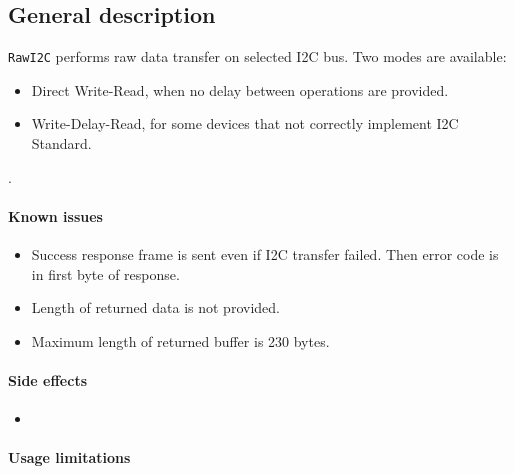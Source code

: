 

\subsection{General description}



\texttt{RawI2C} performs raw data transfer on selected I2C bus.
Two modes are available:
\begin{itemize}
	\item Direct Write-Read, when no delay between operations are provided.
	\item Write-Delay-Read, for some devices that not correctly implement I2C Standard. 
\end{itemize}
.

\paragraph{Known issues}
\begin{itemize}
	\item Success response frame is sent even if I2C transfer failed. Then error code is in first byte of response.
	\item Length of returned data is not provided. 
	\item Maximum length of returned buffer is 230 bytes. 
\end{itemize}

\paragraph{Side effects}
\begin{itemize}
	\item {}
\end{itemize}

\paragraph{Usage limitations}\mbox{}\\ 
\None

